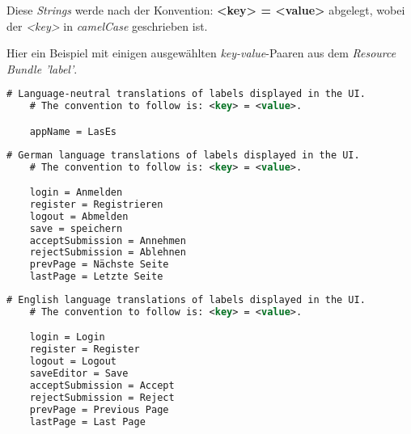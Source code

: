 Diese \emph{Strings} werde nach der Konvention:
\textbf{<key> = <value>}
abgelegt, wobei der \emph{<key>} in \emph{camelCase} geschrieben ist.

Hier ein Beispiel mit einigen ausgewählten \emph{key-value}-Paaren aus
dem \emph{Resource Bundle 'label'}.
\begin{lstlisting}[language=XML, caption = Beispielhafter Ausschnitt aus \emph{label.properties}]
    # Language-neutral translations of labels displayed in the UI.
    # The convention to follow is: <key> = <value>.

    appName = LasEs
\end{lstlisting}
\begin{lstlisting}[language=XML, caption = Beispielhafter Ausschnitt aus \emph{label\_de.properties}]
    # German language translations of labels displayed in the UI.
    # The convention to follow is: <key> = <value>.

    login = Anmelden
    register = Registrieren
    logout = Abmelden
    save = speichern
    acceptSubmission = Annehmen
    rejectSubmission = Ablehnen
    prevPage = Nächste Seite
    lastPage = Letzte Seite
\end{lstlisting}

\begin{lstlisting}[language=XML, caption = Beispielhafter Ausschnitt aus \emph{label\_en.properties}]
    # English language translations of labels displayed in the UI.
    # The convention to follow is: <key> = <value>.

    login = Login
    register = Register
    logout = Logout
    saveEditor = Save
    acceptSubmission = Accept
    rejectSubmission = Reject
    prevPage = Previous Page
    lastPage = Last Page
\end{lstlisting}